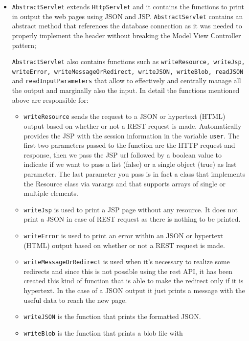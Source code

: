 \begin{itemize}
    \item \texttt{AbstractServlet} extends \texttt{HttpServlet} and
    it contains the functions to print in output the web pages using JSON and JSP.
    \texttt{AbstractServlet} contains an abstract method that references the 
    database connection as it was needed to properly implement the header
    without breaking the Model View Controller pattern;

    \texttt{AbstractServlet} also contains functions such as 
    \texttt{writeResource, writeJsp, writeError, writeMessageOrRedirect, 
    writeJSON, writeBlob, readJSON}  and \texttt{readInputParameters}
    that allow to effectively and centrally manage all the output 
    and marginally also the input.
    In detail the functions mentioned above are responsible for: 
    \begin{itemize}
        \item \texttt{writeResource} sends the request to a JSON
        or hypertext (HTML) output based on whether or not a REST request is made. 
        Automatically provides the JSP with the session information in 
        the variable \texttt{user}.
        The first two parameters passed to the function are the HTTP request and 
        response, then we pass the JSP url followed by a boolean 
        value to indicate if we want to pass a list (false) or a single object (true) as last parameter.
        The last parameter you pass is in fact a class that implements the 
        Resource class via varargs and that supports arrays of single or multiple elements.
        \item \texttt{writeJsp} is used to print a JSP page without any resource.
        It does not print a JSON in case of REST request as there is nothing to be printed.
        \item \texttt{writeError}  is used to print an error within an
        JSON or hypertext (HTML) output based on whether or not a REST request is made. 
        \item \texttt{writeMessageOrRedirect} is used when it's necessary to realize some redirects and since this is not possible 
        using the rest API, it has been created this kind of function that is able to make 
        the redirect only if it is hypertext. In the case of a JSON output it just
        prints a message with the useful data to reach the new page.
        \item \texttt{writeJSON} is the function that prints the formatted JSON.
        \item \texttt{writeBlob} is the function that prints a blob file with 

\end{itemize}
\end{itemize}
